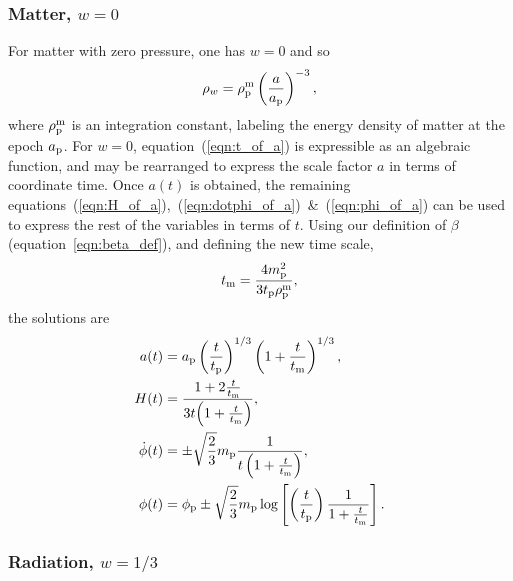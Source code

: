 \subsubsection{Matter, $w=0$}
For matter with zero pressure, one has $w=0$ and so
%
\begin{equation}
  \rho_w = \rho_{\mathrm{p}}^{\mathrm{m}}\left(\frac{a}{a_{\mathrm{p}}}\right)^{-3},
\end{equation}
%
where $\rho_{\mathrm{p}}^{\mathrm{m}}$ is an integration constant, labeling the energy density of matter at the epoch $a_{\mathrm{p}}$.  For $w=0$, equation~(\ref{eqn:t_of_a}) is expressible as an algebraic function, and may be rearranged to express the scale factor $a$ in terms of coordinate time. Once $a(t)$ is obtained, the remaining equations~(\ref{eqn:H_of_a}),~(\ref{eqn:dotphi_of_a})~\&~(\ref{eqn:phi_of_a}) can be used to express the rest of the variables in terms of $t$. Using our definition of $\beta$ (equation~\ref{eqn:beta_def}), and defining the new time scale,
%
\begin{equation}
  t_{\mathrm{m}} = \frac{4m_{\mathrm{p}}^2}{3t_{\mathrm{p}}\rho_{\mathrm{p}}^{\mathrm{m}} },
  \label{eqn:tm}
\end{equation}
the solutions are
%
\begin{align}
  a(t)
  &=
  a_{\mathrm{p}}\left(\frac{t}{t_{\mathrm{p}}}\right)^{1/3}
  \left(1+\frac{t}{t_{\mathrm{m}}}\right)^{1/3} ,
  \\
  H(t) &= 
  \frac{1+2\frac{t}{t_{\mathrm{m}}}}{3t{{\left( 1+\frac{t}{t_{\mathrm{m}}} \right) }}},
  \\
  \dot{\phi}(t) &= 
  \pm\sqrt{\frac{2}{3}}m_{\mathrm{p}}
  \frac{1}
  {t \left( 1+\frac{t}{t_{\mathrm{m}}} \right) },
  \\
  \phi(t) &=
  \phi_{\mathrm{p}} \pm \sqrt{\frac{2}{3}}m_{\mathrm{p}} \log\left[  
  \left(\frac{t}{t_{\mathrm{p}}}\right) 
  \frac {1}{1+\frac{t}{t_{\mathrm{m}}}}  
  \right].
\end{align}
%




\subsubsection{Radiation, $w=1/3$}

